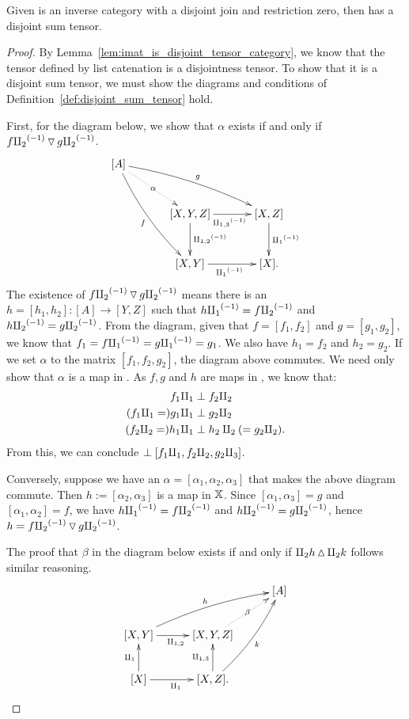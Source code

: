 \begin{lemma}\label{lem:imat_tensor_is_a_disjoint_sum_tensor}
  Given \X is an inverse category with a disjoint join and restriction zero, then \imatx
  has a disjoint sum tensor.
\end{lemma}
\begin{proof}
  By Lemma~\ref{lem:imat_is_disjoint_tensor_category}, we know that the tensor defined by
  list catenation is a disjointness tensor. To show that it is a disjoint sum tensor, we must
  show the diagrams and conditions of Definition~\ref{def:disjoint_sum_tensor} hold.

  First, for the diagram below, we show that $\alpha$ exists if and only if
  $f{\amalg_{2}}^{(-1)} \operatorname{\triangledown} g{\amalg_{2}}^{(-1)}$.
  \begin{align*}
    \xymatrix@C+10pt@R+5pt{
      [A] \ar@/_/[ddr]_f \ar@/^/[drr]^g \ar@{.>}[dr]|-{\alpha} \\
        & [X,Y,Z] \ar[d]^{\icp{1,2}} \ar[r]_{\icp{1,3}} & [X,Z] \ar[d]^{\icpa} \\
        & [X,Y] \ar[r]_{\icpa} & [X].
    }
  \end{align*}
  The existence of $f{\amalg_{2}}^{(-1)} \operatorname{\triangledown} g{\amalg_{2}}^{(-1)}$ means there is an $h = [h_1,h_2]: [A]\to[Y,Z]$ such that
  $h{\amalg_{1}}^{(-1)} = f{\amalg_{2}}^{(-1)}$ and $h{\amalg_{2}}^{(-1)} = g{\amalg_{2}}^{(-1)}$. From the diagram, given that $f = [f_1,f_2]$ and
  $g = [g_1,g_2]$, we know that $f_1 = f{\amalg_{1}}^{(-1)} = g{\amalg_{1}}^{(-1)} = g_1$. We also have $h_1 = f_2$ and
  $h_2 = g_2$. If we set $\alpha$ to the matrix $[f_1,f_2,g_2]$, the diagram above commutes.
  We need only show that $\alpha$ is a map in \imatx. As $f, g$ and $h$ are maps in
  \imatx, we know that:
  \begin{align*}
    f_1\amalg_{1} & \perp f_2 \amalg_{2}\\
    (f_1\amalg_{1} =) g_1\amalg_{1} & \perp g_2 \amalg_{2}\\
    (f_2 \amalg_{2} =) h_1\amalg_{1} & \perp h_2 \amalg_{2} (= g_2 \amalg_{2}).\\
  \end{align*}
  From this, we can conclude $\perp [f_1 \amalg_{1}, f_2 \amalg_{2}, g_2 \amalg_{3}]$.

  Conversely, suppose we have an $\alpha = [\alpha_1, \alpha_2, \alpha_3]$ that makes the
  above diagram commute. Then  $h := [\alpha_2, \alpha_3]$ is a map in $\mathbb{X}$.
  Since $[\alpha_1,\alpha_3] = g$ and $[\alpha_1,\alpha_2] = f$, we have
  $h{\amalg_{1}}^{(-1)} = f{\amalg_{2}}^{(-1)}$ and $h{\amalg_{2}}^{(-1)} = g{\amalg_{2}}^{(-1)}$, hence $h = f{\amalg_{2}}^{(-1)} \operatorname{\triangledown} g{\amalg_{2}}^{(-1)}$.

  The proof that $\beta$ in the diagram below exists if and only if $\amalg_{2}h\operatorname{\vartriangle} \amalg_{2}k$
  follows similar reasoning.
  \[
    \xymatrix@C+5pt{
        &&[A] \\
         [X,Y] \ar[r]_{\cp{1,2}} \ar@/^/[urr]^h &[X,Y,Z] \ar@{.>}[ur]|-{\beta} \\
         [X] \ar[u]^{\cpa} \ar[r]_{\cpa} & [X,Z]. \ar[u]^{\cp{1,3}} \ar@/_/[uur]_k
    }
  \]
\end{proof}

